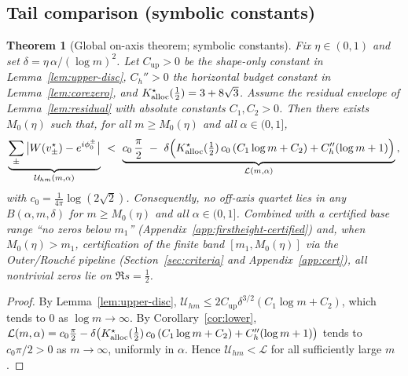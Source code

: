 \documentclass[11pt]{article}
\numberwithin{equation}{section}
\newtheorem{theorem}{Theorem}[section]
\theoremstyle{remark}
\begin{document}
\subsection{Tail comparison (symbolic constants)}\label{subsec:comparison}

\begin{theorem}[Global on-axis theorem; symbolic constants]\label{thm:tail-symbolic}
Fix $\eta\in(0,1)$ and set $\delta=\eta\,\alpha/(\log m)^2$. Let $C_{\mathrm{up}}>0$ be the shape-only constant in Lemma~\ref{lem:upper-disc}, $C_h''>0$ the horizontal budget constant in Lemma~\ref{lem:corezero}, and $K_{\rm alloc}^{\star}(\tfrac12)=3+8\sqrt{3}$. Assume the residual envelope of Lemma~\ref{lem:residual} with absolute constants $C_1,C_2>0$. Then there exists $M_0(\eta)$ such that, for all $m\ge M_0(\eta)$ and all $\alpha\in(0,1]$,
\begin{equation}\label{eq:upper-lower-compare} %
\underbrace{\sum_{\pm}\big|W(v_\pm^\star)-e^{i\phi_0^\pm}\big|}_{\mathcal U_{hm}(m,\alpha)}
\ <\
\underbrace{c_0\,\frac{\pi}{2}\ -\ \delta\Big( K_{\rm alloc}^{\star}(\tfrac12)\,c_0\,(C_1\log m+C_2) + C_h''(\log m+1) \Big)}_{\mathcal L(m,\alpha)}\,,
\end{equation}
with $c_0=\frac{1}{4\pi}\log(2\sqrt{2})$. Consequently, no off-axis quartet lies in any $B(\alpha,m,\delta)$ for $m\ge M_0(\eta)$ and all $\alpha\in(0,1]$. Combined with a certified base range “no zeros below $m_1$” (Appendix~\ref{app:firstheight-certified}) and, when $M_0(\eta)>m_1$, certification of the finite band $[m_1,M_0(\eta)]$ via the Outer/Rouch\'e pipeline (Section~\ref{sec:criteria} and Appendix~\ref{app:cert}), all nontrivial zeros lie on $\Re s=\tfrac12$.
\end{theorem}

\begin{proof}
By Lemma~\ref{lem:upper-disc}, $\mathcal U_{hm}\le 2C_{\mathrm{up}}\delta^{3/2}(C_1\log m+C_2)$, which tends to $0$ as $\log m\to\infty$. By Corollary~\ref{cor:lower}, $\mathcal L(m,\alpha)=c_0\frac{\pi}{2}-\delta\big(K_{\rm alloc}^{\star}(\tfrac12)\,c_0\,(C_1\log m+C_2)+C_h''(\log m+1)\big)$ tends to $c_0\pi/2>0$ as $m\to\infty$, uniformly in $\alpha$. Hence $\mathcal U_{hm}<\mathcal L$ for all sufficiently large $m$.
\end{proof}

\end{document}
